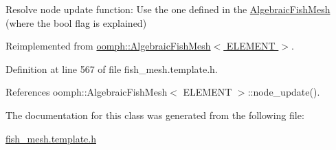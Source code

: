 Resolve node update function\+: Use the one defined in the \hyperlink{classoomph_1_1AlgebraicFishMesh}{Algebraic\+Fish\+Mesh} (where the bool flag is explained) 



Reimplemented from \hyperlink{classoomph_1_1AlgebraicFishMesh_a39cd5a86b0f762efd09f4fefba6da1c3}{oomph\+::\+Algebraic\+Fish\+Mesh$<$ E\+L\+E\+M\+E\+N\+T $>$}.



Definition at line 567 of file fish\+\_\+mesh.\+template.\+h.



References oomph\+::\+Algebraic\+Fish\+Mesh$<$ E\+L\+E\+M\+E\+N\+T $>$\+::node\+\_\+update().



The documentation for this class was generated from the following file\+:\begin{DoxyCompactItemize}
\item 
\hyperlink{fish__mesh_8template_8h}{fish\+\_\+mesh.\+template.\+h}\end{DoxyCompactItemize}

